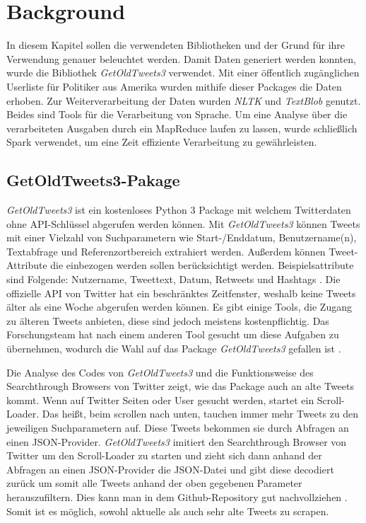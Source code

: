 \section{Background}

In diesem Kapitel sollen die verwendeten Bibliotheken und der Grund für ihre Verwendung genauer beleuchtet werden. Damit Daten generiert werden konnten, wurde die Bibliothek \textit{GetOldTweets3} verwendet. Mit einer öffentlich zugänglichen Userliste für Politiker aus Amerika wurden mithife dieser Packages die Daten erhoben. Zur Weiterverarbeitung der Daten wurden \textit{NLTK} und \textit{TextBlob} genutzt. Beides sind Tools für die Verarbeitung von Sprache. Um eine Analyse über die verarbeiteten Ausgaben durch ein MapReduce laufen zu lassen, wurde schließlich Spark verwendet, um eine Zeit effiziente Verarbeitung zu gewährleisten.
	
\subsection{GetOldTweets3-Pakage}
	
\textit{GetOldTweets3} ist ein kostenloses Python 3 Package mit welchem Twitterdaten ohne API-Schlüssel abgerufen werden können. Mit \textit{GetOldTweets3} können Tweets mit einer Vielzahl von Suchparametern wie Start-/Enddatum, Benutzername(n), Textabfrage und Referenzortbereich extrahiert werden. Außerdem können Tweet-Attribute die einbezogen werden sollen berücksichtigt werden. Beispielsattribute sind Folgende: Nutzername, Tweettext, Datum, Retweets und Hashtags . Die offizielle API von Twitter hat ein beschränktes Zeitfenster, weshalb keine Tweets älter als eine Woche abgerufen werden können. Es gibt einige Tools, die Zugang zu älteren Tweets anbieten, diese sind jedoch meistens kostenpflichtig. Das Forschungsteam hat nach einem anderen Tool gesucht um diese Aufgaben zu übernehmen, wodurch die Wahl auf das Package  \textit{GetOldTweets3} gefallen ist .

Die Analyse des Codes von \textit{GetOldTweets3} und die Funktionsweise des Searchthrough Browsers von Twitter zeigt, wie das Package auch an alte Tweets kommt. Wenn auf Twitter Seiten oder User gesucht werden, startet ein Scroll-Loader. Das heißt, beim scrollen nach unten, tauchen immer mehr Tweets zu den jeweiligen Suchparametern auf. Diese Tweets bekommen sie durch Abfragen an einen JSON-Provider. \textit{GetOldTweets3} imitiert den Searchthrough Browser von Twitter um den Scroll-Loader zu starten und zieht sich dann anhand der Abfragen an einen JSON-Provider die JSON-Datei und gibt diese decodiert zurück um somit alle Tweets anhand der oben gegebenen Parameter herauszufiltern. Dies kann man in dem Github-Repository gut nachvollziehen . Somit ist es möglich, sowohl aktuelle als auch sehr alte Tweets zu scrapen.
	
